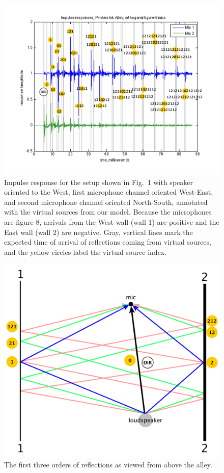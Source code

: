 \documentclass{aes137}
\begin{document}
\begin{figure}[h!] \centering \includegraphics[width=\linewidth]{images/annotated_reflections_v2.pdf} 
\caption{Impulse response for the setup shown in Fig.~1 with speaker
  oriented to the West, first microphone channel oriented West-East, and second microphone channel oriented North-South, annotated with the virtual sources from our
  model. Because the microphones are figure-8, arrivals from the West wall (wall 1) are positive
and the East wall (wall 2) are negative. Gray, vertical lines mark the expected time of arrival of
  reflections coming from virtual sources, and the yellow circles
  label the virtual source index.} %
\end{figure}

\begin{figure}[h!] \centering \includegraphics[width=0.7\linewidth]{images/planview_paths_v2.pdf} 
\caption{The first three orders of reflections as viewed from above the alley.} 
\end{figure}
\end{document}

